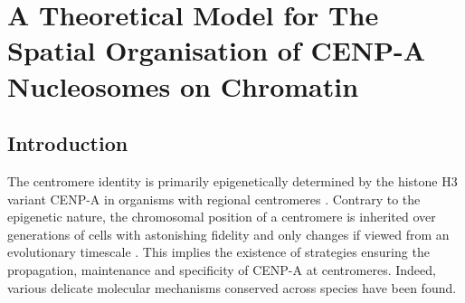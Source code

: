 \chapter{A Theoretical Model for The Spatial Organisation of CENP-A Nucleosomes on Chromatin}
\section{Introduction}

The centromere identity is primarily epigenetically determined by the histone H3 variant CENP-A in organisms with regional centromeres \citep{Warburton1997ImmunolocalizationCentromeres, Vafa1997ChromatinPlate, Earnshaw1985ThreeChromosome, Liu2006MappingCells, Regnier2005CENP-ABubR1, Heun2006, Mendiburo2011, Barnhart2011, Logsdon2015, Logsdon2019}. Contrary to the epigenetic nature, the chromosomal position of a centromere is inherited over generations of cells with astonishing fidelity and only changes if viewed from an evolutionary timescale \citep{Amor2004HumanProgress, Murphy2005DynamicsMaps}. This implies the existence of strategies ensuring the propagation, maintenance and specificity of CENP-A at centromeres. Indeed, various delicate molecular mechanisms conserved across species have been found. 

